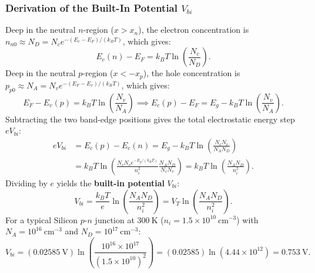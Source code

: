\documentclass[11pt,a4paper]{article}
\begin{document}
\subsubsection{Derivation of the Built-In Potential \texorpdfstring{$V_{bi}$}{Vbi}}
Deep in the neutral $n$-region ($x > x_n$), the electron concentration is $n_{n0} \approx N_D = N_c e^{-(E_c - E_F)/(k_B T)}$, which gives:
\begin{equation}
    E_c(n) - E_F = k_B T \ln\left(\frac{N_c}{N_D}\right).
\end{equation}
Deep in the neutral $p$-region ($x < -x_p$), the hole concentration is $p_{p0} \approx N_A = N_v e^{-(E_F - E_v)/(k_B T)}$, which gives:
\begin{equation}
    E_F - E_v(p) = k_B T \ln\left(\frac{N_v}{N_A}\right) \implies E_c(p) - E_F = E_g - k_B T \ln\left(\frac{N_v}{N_A}\right).
\end{equation}
Subtracting the two band-edge positions gives the total electrostatic energy step $e V_{bi}$:
\begin{align}
    e V_{bi} &= E_c(p) - E_c(n) = E_g - k_B T \ln\left(\frac{N_c N_v}{N_A N_D}\right) \nonumber \\
    &= k_B T \ln\left(\frac{N_c N_v e^{-E_g/(k_B T)}}{n_i^2} \frac{N_A N_D}{N_c N_v}\right) = k_B T \ln\left(\frac{N_A N_D}{n_i^2}\right).
\end{align}
Dividing by $e$ yields the \textbf{built-in potential} $V_{bi}$:
\begin{equation}
    \boxed{V_{bi} = \frac{k_B T}{e}\ln\left(\frac{N_A N_D}{n_i^2}\right) = V_T \ln\left(\frac{N_A N_D}{n_i^2}\right).}
    \label{eq:vbi_master}
\end{equation}
For a typical Silicon $p$-$n$ junction at $300\ \mathrm{K}$ ($n_i = 1.5\times 10^{10}\ \mathrm{cm^{-3}}$) with $N_A = 10^{16}\ \mathrm{cm^{-3}}$ and $N_D = 10^{17}\ \mathrm{cm^{-3}}$:
\begin{equation}
    V_{bi} = (0.02585\ \mathrm{V})\ln\left(\frac{10^{16} \times 10^{17}}{(1.5\times 10^{10})^2}\right) = (0.02585)\ln\left(4.44\times 10^{12}\right) = \mathbf{0.753\ \mathrm{V}}.
\end{equation}
\end{document}
